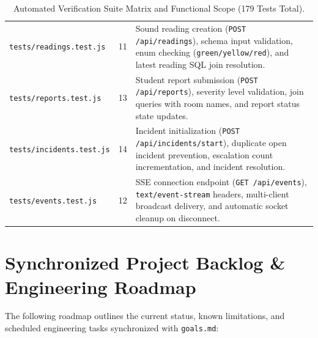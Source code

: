 \documentclass[11pt,a4paper]{article}
\begin{document}
\begin{table}[H]
\begin{tabularx}{\textwidth}{l c X}
\texttt{tests/readings.test.js} & 11 & Sound reading creation (\texttt{POST /api/readings}), schema input validation, enum checking (\texttt{green/yellow/red}), and latest reading SQL join resolution. \\
\texttt{tests/reports.test.js} & 13 & Student report submission (\texttt{POST /api/reports}), severity level validation, join queries with room names, and report status state updates. \\
\texttt{tests/incidents.test.js} & 14 & Incident initialization (\texttt{POST /api/incidents/start}), duplicate open incident prevention, escalation count incrementation, and incident resolution. \\
\texttt{tests/events.test.js} & 12 & SSE connection endpoint (\texttt{GET /api/events}), \texttt{text/event-stream} headers, multi-client broadcast delivery, and automatic socket cleanup on disconnect. \\
\bottomrule
\end{tabularx}
\caption{Automated Verification Suite Matrix and Functional Scope (179 Tests Total).}
\label{tab:tests}
\end{table}

\section{Synchronized Project Backlog \& Engineering Roadmap}

The following roadmap outlines the current status, known limitations, and scheduled engineering tasks synchronized with \texttt{goals.md}:
\end{document}
